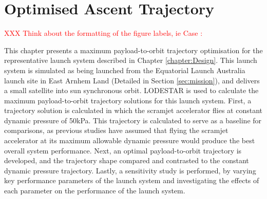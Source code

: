 
\cleardoublepage
\chapter{Optimised Ascent Trajectory}\label{chapter:Ascent}
	
	
\textcolor{red}{XXX Think about the formatting of the figure labels, ie Case : }

	
This chapter presents a maximum payload-to-orbit trajectory optimisation for the representative launch system described in Chapter \ref{chapter:Design}. 
This launch system is simulated as being launched from the Equatorial Launch Australia launch site in East Arnhem Land (Detailed in Section \ref{sec:mission}), and delivers a small satellite into sun synchronous orbit. LODESTAR is used to calculate the maximum payload-to-orbit trajectory solutions for this launch system.
First, a trajectory solution is calculated in which the scramjet accelerator flies at constant dynamic pressure of 50kPa. This trajectory is calculated to serve as a baseline for comparisons, as previous studies have assumed that flying the scramjet accelerator at its maximum allowable dynamic pressure would produce the best overall system performance\cite{Preller2017b}. Next, an optimal payload-to-orbit trajectory is developed, and the trajectory shape compared and contrasted to the constant dynamic pressure trajectory.
Lastly, a sensitivity study is performed, by varying key performance parameters of the launch system and investigating the effects of each parameter on the performance of the launch system. 


